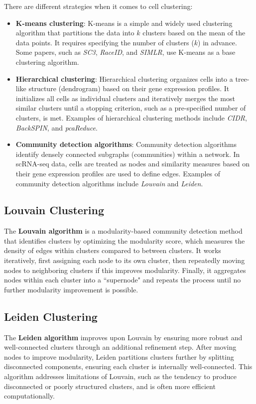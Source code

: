 \documentclass[a4paper]{article}
\begin{document}
There are different strategies when it comes to cell clustering:

\begin{itemize}
  \item \textbf{K-means clustering}: K-means is a simple and widely used
  clustering algorithm that partitions the data into \(k\) clusters based
  on the mean of the data points. It requires specifying the number of clusters (\(k\)) in advance. 
  Some papers, such as \textit{SC3}, \textit{RaceID}, and \textit{SIMLR}, use K-means as a base clustering algorithm.

  \item \textbf{Hierarchical clustering}: Hierarchical clustering organizes
  cells into a tree-like structure (dendrogram) based on their gene expression profiles.
  It initializes all cells as individual clusters and iteratively merges the most similar clusters until a stopping
  criterion, such as a pre-specified number of clusters, is met. Examples of hierarchical clustering methods include
  \textit{CIDR}, \textit{BackSPIN}, and \textit{pcaReduce}.

  \item \textbf{Community detection algorithms}: Community detection algorithms
  identify densely connected subgraphs (communities) within a network. In scRNA-seq data, cells are treated as nodes and similarity
  measures based on their gene expression profiles are used to define edges. Examples of community
  detection algorithms include \textit{Louvain} and \textit{Leiden}.
\end{itemize}

\subsection*{Louvain Clustering}
The \textbf{Louvain algorithm} is a modularity-based community detection method that identifies clusters by optimizing the modularity score, which measures the density of edges within clusters compared to between clusters.  
It works iteratively, first assigning each node to its own cluster, then repeatedly moving nodes to neighboring clusters if this improves modularity.  
Finally, it aggregates nodes within each cluster into a ``supernode" and repeats the process until no further modularity improvement is possible.  

\subsection*{Leiden Clustering}
The \textbf{Leiden algorithm} improves upon Louvain by ensuring more robust and well-connected clusters through an additional refinement step.  
After moving nodes to improve modularity, Leiden partitions clusters further by splitting disconnected components, ensuring each cluster is internally well-connected.  
This algorithm addresses limitations of Louvain, such as the tendency to produce disconnected or poorly structured clusters, and is often more efficient computationally.  
\end{document}
